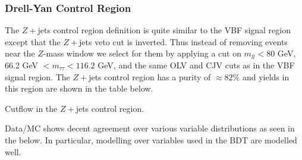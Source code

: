 \subsubsection{Drell-Yan Control Region}

The $Z+$jets control region definition is quite similar to the VBF signal region except that the $Z+$jets veto cut is inverted. Thus instead of removing events near the $Z$-mass window we select for them by applying a cut on $m_{ll}<80$ GeV,  66.2 GeV $< m_{\tau\tau}< 116.2$ GeV, and the same OLV and CJV cuts as in the VBF signal region. The $Z+$jets control region has a purity of $\approx 82\%$ and yields in this region are shown in the table below.

\begin{table}[h!]
\scalebox{0.4}{

}
\caption{Cutflow in the $Z+$jets control region.}
\label{tab:zttcr}
\end{table}

Data/MC shows decent agreement over various variable distributions as seen in the  below. In particular, modelling over variables used in the BDT are modelled well. 

